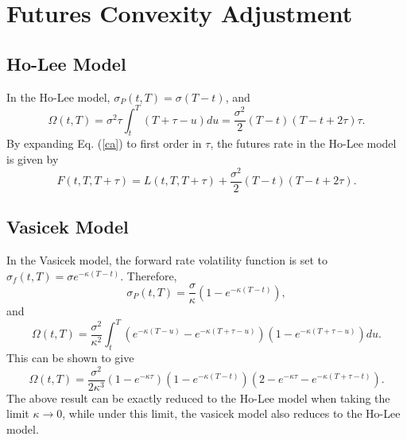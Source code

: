 \documentclass[12pt]{article}
\begin{document}
  \section{Futures Convexity Adjustment}

    \subsection{Ho-Lee Model}

      In the Ho-Lee model, $\sigma_P(t,T)=\sigma(T-t)$, and
      \begin{equation}
        \Omega(t,T)=\sigma^2\tau\int_t^T\left(T+\tau-u\right)du=\frac{\sigma^2}{2}(T-t)(T-t+2\tau)\tau.
      \end{equation}
      By expanding Eq. (\ref{ca}) to first order in $\tau$, the futures rate in the Ho-Lee model is given by
      \begin{equation}
        F(t,T,T+\tau)=L(t,T,T+\tau)+\frac{\sigma^2}{2}(T-t)(T-t+2\tau).
      \end{equation}

    \subsection{Vasicek Model}

      In the Vasicek model, the forward rate volatility function is set to
      $\sigma_f(t,T)=\sigma e^{-\kappa(T-t)}$.
      Therefore,
      \begin{equation}
        \sigma_P(t,T)=\frac{\sigma}{\kappa}\left(1-e^{-\kappa(T-t)}\right),
      \end{equation}
      and
      \begin{equation}
        \Omega(t,T)=\frac{\sigma^2}{\kappa^2}\int_t^T\left(e^{-\kappa(T-u)}-e^{-\kappa(T+\tau-u)}\right)
                                                            \left(1-e^{-\kappa(T+\tau-u)}\right)du.
      \end{equation}
      This can be shown to give
      \begin{equation}
        \Omega(t,T)=\frac{\sigma^2}{2\kappa^3}\left(1-e^{-\kappa\tau}\right)\left(1-e^{-\kappa(T-t)}\right)
                                              \left(2-e^{-\kappa\tau}-e^{-\kappa(T+\tau-t)}\right).
      \end{equation}
      The above result can be exactly reduced to the Ho-Lee model when taking the limit $\kappa\rightarrow 0$,
      while under this limit, the vasicek model also reduces to the Ho-Lee model.
\end{document}
